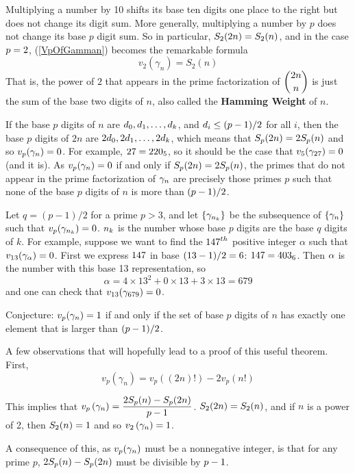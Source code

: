 Multiplying a number by 10 shifts its base ten digits one place to the right but does not change its digit sum. More generally, multiplying a number by $p$ does not change its base $p$ digit sum. So in particular, $\displaystyle S_2(2n) = S_2(n)$, and in the case $\displaystyle p=2$, (\ref{VpOfGamman}) becomes the remarkable formula
\[
  v_2(\gamma_n) = S_2(n)
\]
That is, the power of $2$ that appears in the prime factorization of $\displaystyle \binom{2n}{n}$ is just the sum of the base two digits of $n$, also called the \textbf{Hamming Weight} of $n$.

If the base $p$ digits of $n$ are $\displaystyle d_0, d_1, \ldots, d_k$, and $\displaystyle d_i \leq (p-1)/2$ for all $i$, then the base $p$ digits of $2n$ are $\displaystyle 2d_0, 2d_1, \ldots, 2d_k$, which means that $\displaystyle S_p(2n) = 2 S_p(n)$ and so $\displaystyle v_p(\gamma_n)=0$. For example, $\displaystyle 27=220_5$, so it should be the case that $\displaystyle v_5(\gamma_{27}) =0$ (and it is). As $\displaystyle v_p(\gamma_n)=0$ if and only if $\displaystyle S_p(2n) = 2 S_p(n)$, the primes that do not appear in the prime factorization of $\displaystyle \gamma_n$ are precisely those primes $p$ such that none of the base $p$ digits of $n$ is more than $\displaystyle (p-1)/2$.

Let $q = (p-1)/2$ for a prime $p>3$, and let $\displaystyle \left\{ \gamma_{n_k} \right\}$ be the subsequence of $\displaystyle \left\{ \gamma_n \right\}$ such that $\displaystyle v_p(\gamma_{n_k})=0$. $\displaystyle n_k$ is the number whose base $p$ digits are the base $q$ digits of $k$. For example, suppose we want to find the $\displaystyle 147^{th}$ positive integer $\alpha$ such that $\displaystyle v_{13}(\gamma_{\alpha})=0$. First we express $\displaystyle 147$ in base $\displaystyle (13-1)/2=6$: $\displaystyle 147 = 403_6$. Then $\displaystyle \alpha$ is the number with this base 13 representation, so 
\[
  \alpha = 4\times 13^2 + 0\times 13 + 3\times 13 = 679
\]
and one can check that $\displaystyle v_{13}(\gamma_{679}) = 0$.

Conjecture: $\displaystyle v_p(\gamma_n) = 1$ if and only if the set of base $p$ digits of $n$ has exactly one element that is larger than $\displaystyle (p-1)/2$.



\iffalse
A few observations that will hopefully lead to a proof of this useful theorem. First,  
\[
  v_p(\gamma_n) = v_p( (2n)!) - 2 v_p(n!)
\]

This implies that $\displaystyle v_p\left( \gamma_n \right) = \frac{2 S_p(n) - S_p(2n)}{p-1}$. $\displaystyle S_2(2n) = S_2(n)$, and if $n$ is a power of 2, then $\displaystyle S_2(n)=1$ and so $\displaystyle v_2 \left( \gamma_n \right) = 1$.

A consequence of this, as $\displaystyle v_p(\gamma_n)$ must be a nonnegative integer, is that for any prime $p$, $\displaystyle 2 S_p(n) - S_p(2n)$ must be divisible by $\displaystyle p-1$.


